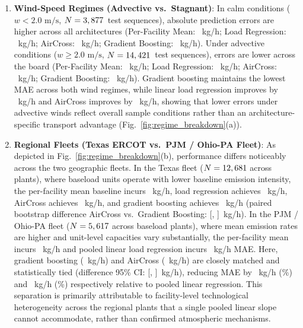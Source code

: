 \documentclass[conference]{IEEEtran}
\begin{document}
\begin{enumerate}
    \item \textbf{Wind-Speed Regimes (Advective vs.\ Stagnant)}: In calm conditions ($w < 2.0\text{ m/s}$, $N = 3,877$~test sequences), absolute prediction errors are higher across all architectures (Per-Facility Mean: \RegimeFacMeanCalmMAE~kg/h; Load Regression: \RegimeLoadRegCalmMAE~kg/h; AirCross: \RegimeAirCrossCalmMAE~kg/h; Gradient Boosting: \RegimeGBCalmMAE~kg/h). Under advective conditions ($w \ge 2.0\text{ m/s}$, $N = 14,421$~test sequences), errors are lower across the board (Per-Facility Mean: \RegimeFacMeanAdvMAE~kg/h; Load Regression: \RegimeLoadRegAdvMAE~kg/h; AirCross: \RegimeAirCrossAdvMAE~kg/h; Gradient Boosting: \RegimeGBAdvMAE~kg/h). Gradient boosting maintains the lowest MAE across both wind regimes, while linear load regression improves by \RegimeLoadRegAdvGainMAE~kg/h and AirCross improves by \RegimeAirCrossAdvGainMAE~kg/h, showing that lower errors under advective winds reflect overall sample conditions rather than an architecture-specific transport advantage (Fig.~\ref{fig:regime_breakdown}(a)).
    \item \textbf{Regional Fleets (Texas ERCOT vs.\ PJM / Ohio-PA Fleet)}: As depicted in Fig.~\ref{fig:regime_breakdown}(b), performance differs noticeably across the two geographic fleets. In the Texas fleet ($N = 12,681$ across \NTxPlants{} plants), where baseload units operate with lower baseline emission intensity, the per-facility mean baseline incurs \RegimeFacMeanTxMAE~kg/h, load regression achieves \RegimeLoadRegTxMAE~kg/h, AirCross achieves \RegimeAirCrossTxMAE~kg/h, and gradient boosting achieves \RegimeGBTxMAE~kg/h (paired bootstrap difference AirCross vs.\ Gradient Boosting: [\RegimeTXDiffAirCrossGBlo, \RegimeTXDiffAirCrossGBhi]~kg/h). In the PJM / Ohio-PA fleet ($N = 5,617$ across \NMidwestPlants{} baseload plants), where mean emission rates are higher and unit-level capacities vary substantially, the per-facility mean incurs \RegimeFacMeanMidwestMAE~kg/h and pooled linear load regression incurs \RegimeLoadRegMidwestMAE~kg/h MAE. Here, gradient boosting (\RegimeGBMidwestMAE~kg/h) and AirCross (\RegimeAirCrossMidwestMAE~kg/h) are closely matched and statistically tied (difference 95\% CI: [\RegimeMWDiffAirCrossGBlo, \RegimeMWDiffAirCrossGBhi]~kg/h), reducing MAE by \RegimeGBMidwestGainMAE~kg/h (\RegimeGBMidwestVsLoadRegPct\%) and \RegimeAirCrossMidwestGainMAE~kg/h (\RegimeAirCrossMidwestVsLoadRegPct\%) respectively relative to pooled linear regression. This separation is primarily attributable to facility-level technological heterogeneity across the regional plants that a single pooled linear slope cannot accommodate, rather than confirmed atmospheric mechanisms.
\end{enumerate}
\end{document}
